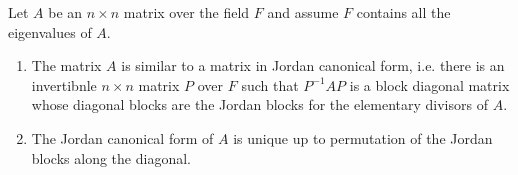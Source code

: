 \begin{theorem}
\label{theorem-jordan-form}
\begin{reference}
\cite[Theorem 22, Section 12.3]{dummit}
\end{reference}
Let $A$ be an $n \times n$
matrix over the field $F$
and assume $F$ contains
all the eigenvalues of $A$.
\begin{enumerate}
\item The matrix $A$ is similar
to a matrix in Jordan canonical form,
i.e. there is an invertibnle $n \times n$
matrix $P$ over $F$ such that
$P^{-1}AP$ is a block diagonal matrix
whose diagonal blocks are the 
Jordan blocks for the elementary
divisors of $A$.
\item The Jordan canonical form
of $A$ is unique up to permutation
of the Jordan blocks along the diagonal.
\end{enumerate}
\end{theorem}

